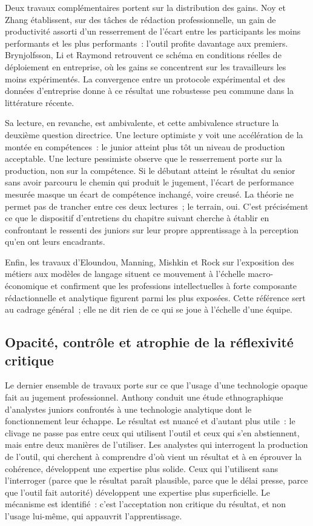 Deux travaux complémentaires portent sur la distribution des gains. Noy et Zhang
\cite{noy2023} établissent, sur des tâches de rédaction professionnelle, un gain de
productivité assorti d'un resserrement de l'écart entre les participants les moins
performants et les plus performants~: l'outil profite davantage aux premiers. Brynjolfsson,
Li et Raymond \cite{brynjolfsson2025} retrouvent ce schéma en conditions réelles de
déploiement en entreprise, où les gains se concentrent sur les travailleurs les moins
expérimentés. La convergence entre un protocole expérimental et des données d'entreprise
donne à ce résultat une robustesse peu commune dans la littérature récente.

Sa lecture, en revanche, est ambivalente, et cette ambivalence structure la deuxième
question directrice. Une lecture optimiste y voit une accélération de la montée en
compétences~: le junior atteint plus tôt un niveau de production acceptable. Une lecture
pessimiste observe que le resserrement porte sur la production, non sur la compétence. Si
le débutant atteint le résultat du senior sans avoir parcouru le chemin qui produit le
jugement, l'écart de performance mesurée masque un écart de compétence inchangé, voire
creusé. La théorie ne permet pas de trancher entre ces deux lectures~; le terrain, oui.
C'est précisément ce que le dispositif d'entretiens du chapitre suivant cherche à établir en
confrontant le ressenti des juniors sur leur propre apprentissage à la perception qu'en ont
leurs encadrants.

Enfin, les travaux d'Eloundou, Manning, Mishkin et Rock \cite{eloundou2024} sur l'exposition
des métiers aux modèles de langage situent ce mouvement à l'échelle macro-économique et
confirment que les professions intellectuelles à forte composante rédactionnelle et
analytique figurent parmi les plus exposées. Cette référence sert au cadrage général~; elle
ne dit rien de ce qui se joue à l'échelle d'une équipe.

\subsection{Opacité, contrôle et atrophie de la réflexivité critique}

Le dernier ensemble de travaux porte sur ce que l'usage d'une technologie opaque fait au
jugement professionnel. Anthony \cite{anthony2021} conduit une étude ethnographique
d'analystes juniors confrontés à une technologie analytique dont le fonctionnement leur
échappe. Le résultat est nuancé et d'autant plus utile~: le clivage ne passe pas entre ceux
qui utilisent l'outil et ceux qui s'en abstiennent, mais entre deux manières de l'utiliser.
Les analystes qui interrogent la production de l'outil, qui cherchent à comprendre d'où
vient un résultat et à en éprouver la cohérence, développent une expertise plus solide. Ceux
qui l'utilisent sans l'interroger (parce que le résultat paraît plausible, parce que le
délai presse, parce que l'outil fait autorité) développent une expertise plus
superficielle. Le mécanisme est identifié~: c'est l'acceptation non critique du résultat, et
non l'usage lui-même, qui appauvrit l'apprentissage.

